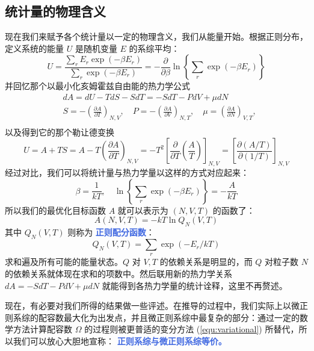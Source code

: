 \subsection{统计量的物理含义}
现在我们来赋予各个统计量以一定的物理含义，我们从能量开始。根据正则分布，定义系统的能量 $U$ 是随机变量 $E$ 的系综平均：
\begin{equation}
    U=\frac{\displaystyle\sum_r E_r \exp \left(-\beta E_r\right)}{\displaystyle\sum_r \exp \left(-\beta E_r\right)}=-\frac{\partial}{\partial \beta} \ln \left\{\sum_r \exp \left(-\beta E_r\right)\right\}
\end{equation}
并回忆那个以最小化亥姆霍兹自由能的热力学公式
\[
    \begin{aligned}
& d A=d U-T d S-S d T=-S d T-P d V+\mu d N \\
& S=-\left(\frac{\partial A}{\partial T}\right)_{N, V}, \quad P=-\left(\frac{\partial A}{\partial V}\right)_{N, T}, \quad \mu=\left(\frac{\partial A}{\partial N}\right)_{V, T}, \\
&
\end{aligned}
\]
以及得到它的那个勒让德变换
\[
    U=A+T S=A-T\left(\frac{\partial A}{\partial T}\right)_{N, V}=-T^2\left[\frac{\partial}{\partial T}\left(\frac{A}{T}\right)\right]_{N, V}=\left[\frac{\partial(A / T)}{\partial(1 / T)}\right]_{N, V}
\]
经过对比，我们可以将统计量与热力学量以这样的方式对应起来：
\begin{equation}
    \beta=\frac{1}{k T}, \quad \ln \left\{\sum_r \exp \left(-\beta E_r\right)\right\}=-\frac{A}{k T}
\end{equation}
所以我们的最优化目标函数 $A$ 就可以表示为 $(N,V,T)$ 的函数了：
\begin{equation}
        A(N, V, T)=-k T \ln Q_N(V, T)
\end{equation}
其中 $Q_N(V,T)$ 则称为 \textcolor{RoyalBlue}{\textbf{\kaishu 正则配分函数}}：
\begin{equation}
    Q_N(V, T)=\sum_r \exp \left(-E_r / k T\right)
\end{equation}
求和遍及所有可能的能量状态。$Q$ 对 $V,T$ 的依赖关系是明显的，而 $Q$ 对粒子数 $N$ 的依赖关系就体现在求和的项数中。然后联用新的热力学关系 $d A= -S d T-P d V+\mu d N $ 就能得到各热力学量的统计诠释，这里不再赘述。

现在，有必要对我们所得的结果做一些评述。在推导的过程中，我们实际上以微正则系综的配容数最大化为出发点，并且微正则系综中最复杂的部分：通过一定的数学方法计算配容数 $\Omega$ 的过程则被更普适的变分方法 (\ref*{equ:variational}) 所替代，所以我们可以放心大胆地宣称： \textcolor{RoyalBlue}{\textbf{\kaishu  正则系综与微正则系综等价。}}

